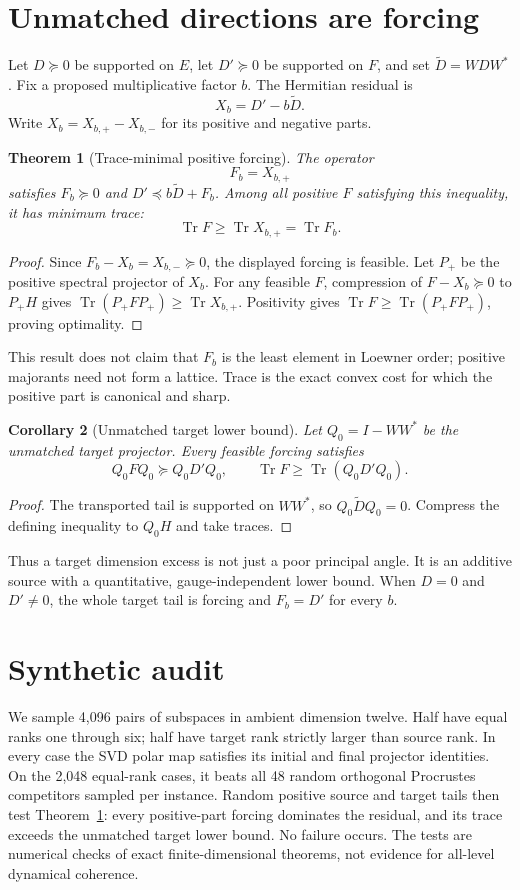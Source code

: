 \documentclass[12pt]{article}
\newtheorem{theorem}{Theorem}
\newtheorem{corollary}[theorem]{Corollary}
\newcommand{\Tr}{\operatorname{Tr}}
\begin{document}
\section{Unmatched directions are forcing}
Let $D\succeq0$ be supported on $E$, let $D'\succeq0$ be supported on $F$,
and set $\widetilde D=WDW^*$.  Fix a proposed multiplicative factor $b$.
The Hermitian residual is
\[
 X_b=D'-b\widetilde D.
\]
Write $X_b=X_{b,+}-X_{b,-}$ for its positive and negative parts.

\begin{theorem}[Trace-minimal positive forcing]\label{thm:forcing}
The operator
\[
 F_b=X_{b,+}
\]
satisfies $F_b\succeq0$ and
$D'\preceq b\widetilde D+F_b$.  Among all positive $F$ satisfying this
inequality, it has minimum trace:
\[
 \Tr F\geq\Tr X_{b,+}=\Tr F_b.
\]
\end{theorem}

\begin{proof}
Since $F_b-X_b=X_{b,-}\succeq0$, the displayed forcing is feasible.  Let
$P_+$ be the positive spectral projector of $X_b$.  For any feasible
$F$, compression of $F-X_b\succeq0$ to $P_+H$ gives
$\Tr(P_+FP_+)\geq\Tr X_{b,+}$.  Positivity gives
$\Tr F\geq\Tr(P_+FP_+)$, proving optimality.
\end{proof}

This result does not claim that $F_b$ is the least element in Loewner order;
positive majorants need not form a lattice.  Trace is the exact convex cost
for which the positive part is canonical and sharp.

\begin{corollary}[Unmatched target lower bound]\label{cor:unmatched}
Let $Q_0=I-WW^*$ be the unmatched target projector.  Every feasible forcing
satisfies
\[
 Q_0FQ_0\succeq Q_0D'Q_0,
 \qquad
 \Tr F\geq\Tr(Q_0D'Q_0).
\]
\end{corollary}
\begin{proof}
The transported tail is supported on $WW^*$, so
$Q_0\widetilde DQ_0=0$.  Compress the defining inequality to $Q_0H$ and
take traces.
\end{proof}

Thus a target dimension excess is not just a poor principal angle.  It is
an additive source with a quantitative, gauge-independent lower bound.
When $D=0$ and $D'\neq0$, the whole target tail is forcing and
$F_b=D'$ for every $b$.

\section{Synthetic audit}
We sample 4,096 pairs of subspaces in ambient dimension twelve.  Half have
equal ranks one through six; half have target rank strictly larger than
source rank.  In every case the SVD polar map satisfies its initial and
final projector identities.  On the 2,048 equal-rank cases, it beats all 48
random orthogonal Procrustes competitors sampled per instance.  Random
positive source and target tails then test Theorem~\ref{thm:forcing}: every
positive-part forcing dominates the residual, and its trace exceeds the
unmatched target lower bound.  No failure occurs.  The tests are numerical
checks of exact finite-dimensional theorems, not evidence for all-level
dynamical coherence.
\end{document}
